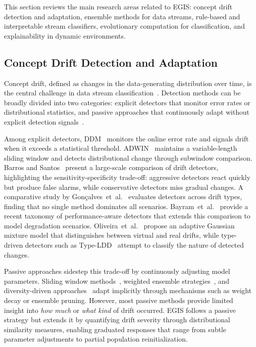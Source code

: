 \documentclass[lettersize,journal]{IEEEtran}
\begin{document}
This section reviews the main research areas related to EGIS: concept drift detection and adaptation, ensemble methods for data streams, rule-based and interpretable stream classifiers, evolutionary computation for classification, and explainability in dynamic environments.

\subsection{Concept Drift Detection and Adaptation}

Concept drift, defined as changes in the data-generating distribution over time, is the central challenge in data stream classification~\cite{gama2014survey, lu2019concept, hinder2024drift}. Detection methods can be broadly divided into two categories: explicit detectors that monitor error rates or distributional statistics, and passive approaches that continuously adapt without explicit detection signals~\cite{ditzler2015nonstationary}.

Among explicit detectors, DDM~\cite{gama2004learning} monitors the online error rate and signals drift when it exceeds a statistical threshold. ADWIN~\cite{bifet2007learning} maintains a variable-length sliding window and detects distributional change through subwindow comparison. Barros and Santos~\cite{barros2018drift} present a large-scale comparison of drift detectors, highlighting the sensitivity-specificity trade-off: aggressive detectors react quickly but produce false alarms, while conservative detectors miss gradual changes. A comparative study by Gon\c{c}alves~et~al.~\cite{goncalves2014comparative} evaluates detectors across drift types, finding that no single method dominates all scenarios. Bayram~et~al.~\cite{bayram2022concept} provide a recent taxonomy of performance-aware detectors that extends this comparison to model degradation scenarios. Oliveira~et~al.~\cite{oliveira2023gmm} propose an adaptive Gaussian mixture model that distinguishes between virtual and real drifts, while type-driven detectors such as Type-LDD~\cite{yu2024typeldd} attempt to classify the nature of detected changes.

Passive approaches sidestep this trade-off by continuously adjusting model parameters. Sliding window methods~\cite{losing2018incremental}, weighted ensemble strategies~\cite{kolter2007dwm}, and diversity-driven approaches~\cite{minku2011ddd} adapt implicitly through mechanisms such as weight decay or ensemble pruning. However, most passive methods provide limited insight into \emph{how much} or \emph{what kind} of drift occurred. EGIS follows a passive strategy but extends it by quantifying drift severity through distributional similarity measures, enabling graduated responses that range from subtle parameter adjustments to partial population reinitialization.
\end{document}
